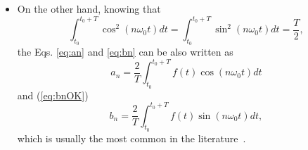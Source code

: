 \begin{itemize}
\item On the other hand, knowing that
  $$
  \int_{t_0}^{t_0+T} \cos^2(n\omega_0t)dt = \int_{t_0}^{t_0+T}
  \sin^2(n\omega_0t)dt = \frac{T}{2},
  $$
  the Eqs. \ref{eq:an} and \ref{eq:bn} can be also written as
  \begin{equation}
    a_n = \frac{2}{T}\int_{t_0}^{t_0+T} f(t)\cos(n\omega_0t)dt
    \tag{anOK}
    \label{eq:anOK}
  \end{equation}
  and (\ref{eq:bnOK})
  \begin{equation}
    b_n = \frac{2}{T}\int_{t_0}^{t_0+T} f(t)\sin(n\omega_0t)dt,
    \tag{bnOK}
    \label{eq:bnOK}
  \end{equation}
  which is usually the most common in the literature~\cite{Lathi,Oppenheim}.
\end{itemize}

